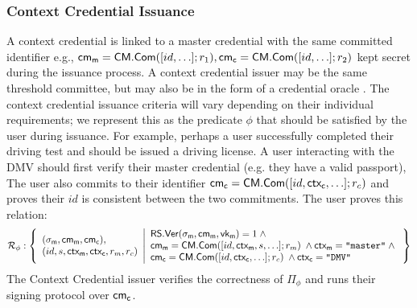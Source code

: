 \subsubsection*{Context Credential Issuance}
A context credential is linked to a master credential with the same committed identifier e.g., $\mathsf{cm_m} = \mathsf{CM.Com}([id,\ldots];r_1), \mathsf{cm_c} = \mathsf{CM.Com}([id, \ldots];r_2)$ kept secret during the issuance process.
A context credential issuer may be the same threshold committee, but may also be in the form of a credential oracle \cite{zhang_deco_2020, celi_distefano_2025, baldimtsi_zklogin_2024, ritzdorf_tls-n_2018}. The context credential issuance criteria will vary depending on their individual requirements; we represent this as the predicate $\phi$ that should be satisfied by the user during issuance. For example, perhaps a user successfully completed their driving test and should be issued a driving license. A user interacting with the DMV should first verify their master credential (e.g. they have a valid passport), The user also commits to their identifier $\mathsf{cm_c} = \mathsf{CM.Com}([id, \mathsf{ctx_c}, \ldots]; r_c)$ and proves their $id$ is consistent between the two commitments. The user proves this relation:
\[
\mathcal{R}_{\phi}: \left\{ 
\begin{array}{l}
(\sigma_{\mathsf{m}}, \mathsf{cm_m}, \mathsf{cm_c}), \\
(id, s, \mathsf{ctx_m}, \mathsf{ctx_c}, r_m, r_c) 
\end{array}
\middle| 
\begin{array}{lcl}
    \mathsf{RS.Ver}(\sigma_{\mathsf{m}}, \mathsf{cm_m}, \mathsf{vk_m}) = 1 \; \wedge \; \\
    \mathsf{cm_m} = \mathsf{CM.Com}([id, \mathsf{ctx_m}, s, \ldots]; r_m) \; \wedge \mathsf{ctx_m} = \texttt{"master"} \; \wedge \; \\
    \mathsf{cm_c} = \mathsf{CM.Com}([id, \mathsf{ctx_c}, \ldots]; r_c) \; \wedge \mathsf{ctx_c} = \texttt{"DMV"} \; \\
\end{array} \right\}
\]
The Context Credential issuer verifies the correctness of $\Pi_\phi$ and runs their signing protocol over $\mathsf{cm_c}$.

